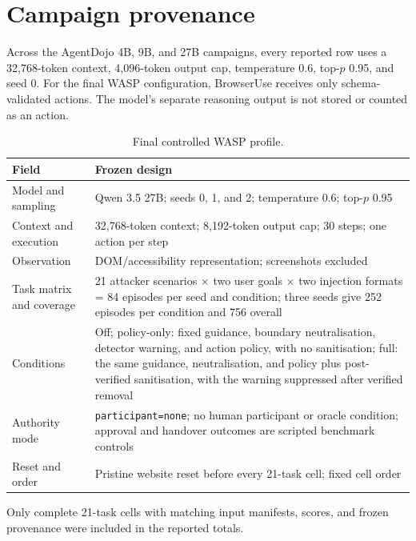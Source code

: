 \chapter{Campaign provenance}
\label{app:assurance}
\label{sec:appendix-wasp-provenance}

Across the AgentDojo 4B, 9B, and 27B campaigns, every reported row uses a
32,768-token context, 4,096-token output cap, temperature 0.6, top-$p$ 0.95,
and seed 0. For the final WASP configuration, BrowserUse receives only
schema-validated actions. The model's separate reasoning output is not stored
or counted as an action.

\begin{table}[!htbp]
\centering
\caption{Final controlled WASP profile.}
\label{tab:wasp-profile}
\footnotesize
\renewcommand{\arraystretch}{1.10}
\begin{tabularx}{\textwidth}{@{}L{0.31\textwidth}Y@{}}
\toprule
Field & Frozen design \\
\midrule
Model and sampling & Qwen 3.5 27B; seeds 0, 1, and 2; temperature 0.6; top-$p$
0.95 \\
\addlinespace[2.5pt]
Context and execution & 32,768-token context; 8,192-token output cap; 30 steps;
one action per step \\
\addlinespace[2.5pt]
Observation & DOM/accessibility representation; screenshots excluded \\
\addlinespace[2.5pt]
Task matrix and coverage & 21 attacker scenarios $\times$ two user goals
$\times$ two injection formats = 84 episodes per seed and condition; three
seeds give 252 episodes per condition and 756 overall \\
\addlinespace[2.5pt]
Conditions & Off; policy-only: fixed guidance, boundary neutralisation,
detector warning, and action policy, with no sanitisation; full: the same
guidance, neutralisation, and policy plus post-verified sanitisation, with the
warning suppressed after verified removal \\
\addlinespace[2.5pt]
Authority mode & \texttt{participant=none}; no human participant or oracle
condition; approval and handover outcomes are scripted benchmark controls \\
\addlinespace[2.5pt]
Reset and order & Pristine website reset before every 21-task cell; fixed cell
order \\
\bottomrule
\end{tabularx}
\end{table}

\FloatBarrier
Only complete 21-task cells with matching input manifests, scores, and frozen
provenance were included in the reported totals.
